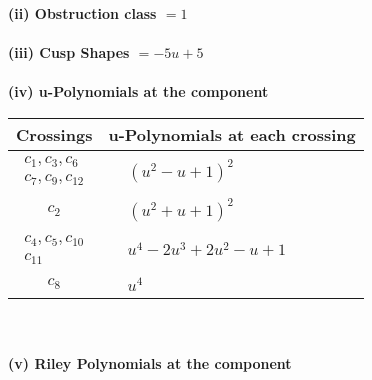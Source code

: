 \documentclass[1p]{elsarticle_modified}
\theoremstyle{definition}
\begin{document}
\flushleft \textbf{(ii) Obstruction class $= 1$}\\~\\
\flushleft \textbf{(iii) Cusp Shapes $= -5 u+5$}\\~\\
\newpage\renewcommand{\arraystretch}{1}
\flushleft \textbf{(iv) u-Polynomials at the component}\newline \\
\begin{tabular}{m{50pt}|m{274pt}}
Crossings & \hspace{64pt}u-Polynomials at each crossing \\
\hline $$\begin{aligned}c_{1},c_{3},c_{6}\\c_{7},c_{9},c_{12}\end{aligned}$$&$\begin{aligned}
&(u^2- u+1)^2
\end{aligned}$\\
\hline $$\begin{aligned}c_{2}\end{aligned}$$&$\begin{aligned}
&(u^2+u+1)^2
\end{aligned}$\\
\hline $$\begin{aligned}c_{4},c_{5},c_{10}\\c_{11}\end{aligned}$$&$\begin{aligned}
&u^4-2 u^3+2 u^2- u+1
\end{aligned}$\\
\hline $$\begin{aligned}c_{8}\end{aligned}$$&$\begin{aligned}
&u^4
\end{aligned}$\\
\hline
\end{tabular}\\~\\
\newpage\renewcommand{\arraystretch}{1}
\flushleft \textbf{(v) Riley Polynomials at the component}\newline \\
\end{document}

